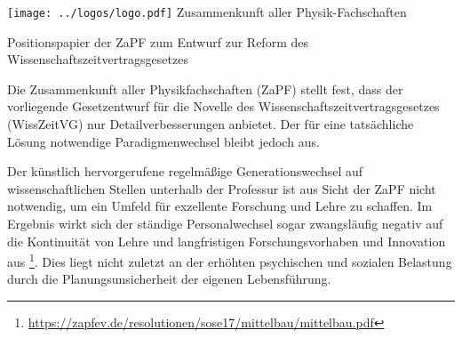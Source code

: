 \documentclass[DIV=calc]{scrartcl}
\begin{document}
\hspace{0.87\textwidth}
\begin{minipage}{120pt}
	\vspace{-1.8cm}
	\texttt{[image: ../logos/logo.pdf]}
	\centering
	\small Zusammenkunft aller Physik-Fachschaften
\end{minipage}

\begin{center}
  \huge{Positionspapier der ZaPF zum Entwurf zur Reform des Wissenschaftszeitvertragsgesetzes}\vspace{.25\baselineskip}\\
  \normalsize
\end{center}
\vspace{1cm}






Die Zusammenkunft aller Physikfachschaften (ZaPF) stellt fest, dass der vorliegende Gesetzentwurf für die Novelle des Wissenschaftszeitvertragsgesetzes (WissZeitVG) nur Detailverbesserungen anbietet.
Der für eine tatsächliche Lösung notwendige Paradigmenwechsel bleibt jedoch aus.

Der künstlich hervorgerufene regelmäßige Generationswechsel auf wissenschaftlichen Stellen unterhalb der Professur ist aus Sicht der ZaPF nicht notwendig, um ein Umfeld für exzellente Forschung und Lehre zu schaffen. Im Ergebnis wirkt sich der ständige Personalwechsel sogar zwangsläufig negativ auf die Kontinuität von Lehre und langfristigen Forschungsvorhaben und Innovation aus \footnote{\url{https://zapfev.de/resolutionen/sose17/mittelbau/mittelbau.pdf}}. Dies liegt nicht zuletzt an der erhöhten psychischen und sozialen Belastung durch die Planungsunsicherheit der eigenen Lebensführung.
\end{document}
